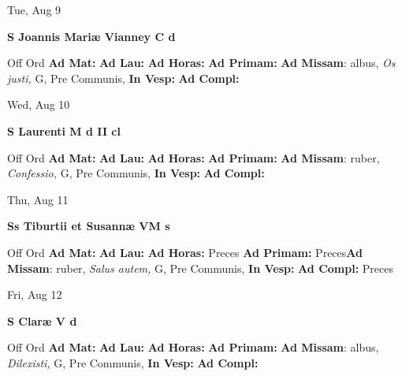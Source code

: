 \documentclass[10pt]{book}
\begin{document}
\begin{center}
\begin{minipage}{3.5in}
\vspace{2em}
\begin{center}Tue, Aug 9
\end{center}
\textbf{ \large S Joannis Mariæ Vianney C
\textnormal{\normalsize d}}

\begin{justify}Off Ord
\textbf{Ad Mat: }
\textbf{Ad Lau: }
\textbf{Ad Horas: }
\textbf{Ad Primam: }\textbf{Ad Missam}: albus, \textit{Os justi,} G, Pre Communis, 
\textbf{In Vesp: }
\textbf{Ad Compl: }
\end{justify}
\end{minipage}
\end{center}

\begin{center}
\begin{minipage}{3.5in}
\vspace{2em}
\begin{center}Wed, Aug 10
\end{center}
\textbf{ \large S Laurenti M
\textnormal{\normalsize d II cl}}

\begin{justify}Off Ord
\textbf{Ad Mat: }
\textbf{Ad Lau: }
\textbf{Ad Horas: }
\textbf{Ad Primam: }\textbf{Ad Missam}: ruber, \textit{Confessio,} G, Pre Communis, 
\textbf{In Vesp: }
\textbf{Ad Compl: }
\end{justify}
\end{minipage}
\end{center}

\begin{center}
\begin{minipage}{3.5in}
\vspace{2em}
\begin{center}Thu, Aug 11
\end{center}
\textbf{ \large Ss Tiburtii et Susannæ VM
\textnormal{\normalsize s}}

\begin{justify}Off Ord
\textbf{Ad Mat: }
\textbf{Ad Lau: }
\textbf{Ad Horas: }Preces
\textbf{Ad Primam: }Preces\textbf{Ad Missam}: ruber, \textit{Salus autem,} G, Pre Communis, 
\textbf{In Vesp: }
\textbf{Ad Compl: }Preces
\end{justify}
\end{minipage}
\end{center}

\begin{center}
\begin{minipage}{3.5in}
\vspace{2em}
\begin{center}Fri, Aug 12
\end{center}
\textbf{ \large S Claræ V
\textnormal{\normalsize d}}

\begin{justify}Off Ord
\textbf{Ad Mat: }
\textbf{Ad Lau: }
\textbf{Ad Horas: }
\textbf{Ad Primam: }\textbf{Ad Missam}: albus, \textit{Dilexisti,} G, Pre Communis, 
\textbf{In Vesp: }
\textbf{Ad Compl: }
\end{justify}
\end{minipage}
\end{center}
\end{document}
